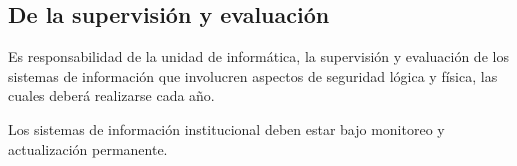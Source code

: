 \documentclass{book}
\begin{document}
            \subsection{De la supervisión y evaluación}
                Es responsabilidad de la unidad de informática, la supervisión y evaluación de
                los sistemas de información que involucren aspectos de seguridad lógica y física, las
                cuales deberá realizarse cada año.
                
                Los sistemas de información institucional deben estar bajo monitoreo y
                actualización permanente.
            \
        \
    \
    
\end{document}
